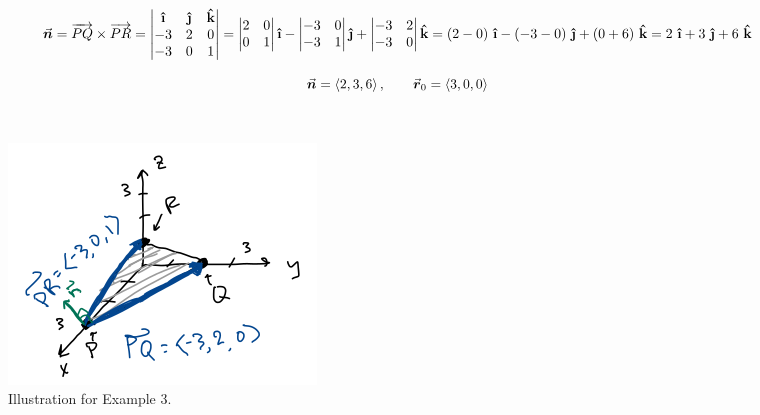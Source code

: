 \[
\n = \overrightarrow{PQ} \times \overrightarrow{PR} = \begin{vmatrix}
\ihat & \jhat & \khat\\
-3 & 2 & 0\\
-3 & 0 & 1
\end{vmatrix}
 = \begin{vmatrix}
 2 & 0\\
 0 & 1
 \end{vmatrix}
 \ihat
 - \begin{vmatrix}
 -3 & 0\\
 -3 & 1
 \end{vmatrix}
 \jhat
 + \begin{vmatrix}
 -3 & 2\\
 -3 & 0
 \end{vmatrix}
 \khat
 = (2-0)\ \ihat - (-3-0)\ \jhat + (0+6)\ \khat = 2\ \ihat + 3\ \jhat + 6\ \khat
 \]
 
  \[
\n = \<2, 3, 6\>, \qquad \r_0 = \<3, 0, 0\>
\]

~\\





\begin{figure}[!h]
\centering
\includegraphics[width=\textwidth]{Ch2s5-ex3.png}
\caption{Illustration for Example 3.}
\end{figure}


\hspace*{.2in}





